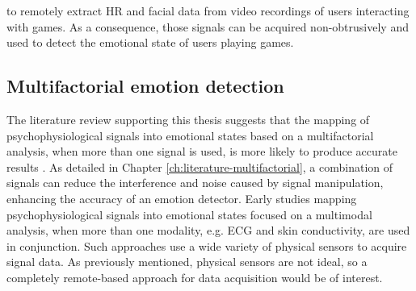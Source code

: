 to remotely extract HR and facial data from video recordings of users interacting with games. As a consequence, those signals can be acquired non-obtrusively and used to detect the emotional state of users playing games.



\subsection{Multifactorial emotion detection}

The literature review supporting this thesis suggests that the mapping of psychophysiological signals into emotional states based on a multifactorial analysis, when more than one signal is used, is more likely to produce accurate results \parencite{kukolja2014comparative}. As detailed in Chapter \ref{ch:literature-multifactorial}, a combination of signals can reduce the interference and noise caused by signal manipulation, enhancing the accuracy of an emotion detector. Early studies mapping psychophysiological signals into emotional states focused on a multimodal analysis, when more than one modality, e.g. ECG and skin conductivity, are used in conjunction. Such approaches use a wide variety of physical sensors to acquire signal data. As previously mentioned, physical sensors are not ideal, so a completely remote-based approach for data acquisition would be of interest.

